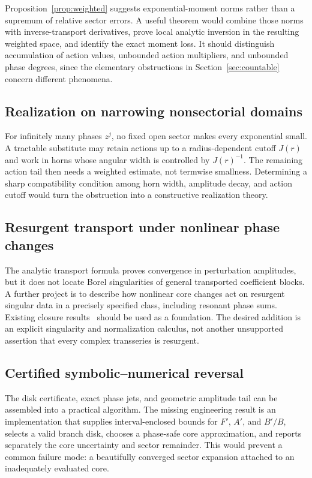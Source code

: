 \documentclass[11pt,a4paper]{article}
\theoremstyle{definition}
\theoremstyle{remark}
\newcommand{\sect}[1]{Section~\ref{#1}}
\numberwithin{equation}{section}
\begin{document}
Proposition~\ref{prop:weighted} suggests exponential-moment norms rather than a supremum of relative sector errors. A useful theorem would combine those norms with inverse-transport derivatives, prove local analytic inversion in the resulting weighted space, and identify the exact moment loss. It should distinguish accumulation of action values, unbounded action multipliers, and unbounded phase degrees, since the elementary obstructions in \sect{sec:countable} concern different phenomena.

\subsection{Realization on narrowing nonsectorial domains}

For infinitely many phases $z^j$, no fixed open sector makes every exponential small. A tractable substitute may retain actions up to a radius-dependent cutoff $J(r)$ and work in horns whose angular width is controlled by $J(r)^{-1}$. The remaining action tail then needs a weighted estimate, not termwise smallness. Determining a sharp compatibility condition among horn width, amplitude decay, and action cutoff would turn the obstruction into a constructive realization theory.

\subsection{Resurgent transport under nonlinear phase changes}

The analytic transport formula proves convergence in perturbation amplitudes, but it does not locate Borel singularities of general transported coefficient blocks. A further project is to describe how nonlinear core changes act on resurgent singular data in a precisely specified class, including resonant phase sums. Existing closure results~\cite{SauzinNonlinear} should be used as a foundation. The desired addition is an explicit singularity and normalization calculus, not another unsupported assertion that every complex transseries is resurgent.

\subsection{Certified symbolic--numerical reversal}

The disk certificate, exact phase jets, and geometric amplitude tail can be assembled into a practical algorithm. The missing engineering result is an implementation that supplies interval-enclosed bounds for $F'$, $A'$, and $B'/B$, selects a valid branch disk, chooses a phase-safe core approximation, and reports separately the core uncertainty and sector remainder. This would prevent a common failure mode: a beautifully converged sector expansion attached to an inadequately evaluated core.
\end{document}
